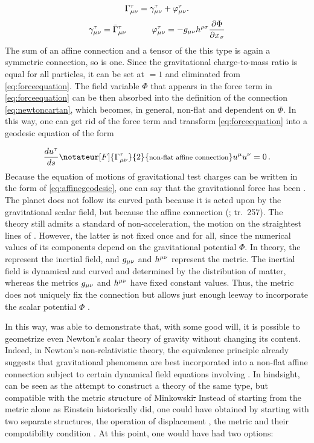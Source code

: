 \documentclass[submitted]{article}
\renewcommand{\Mink}{Minkowski\xspace}
\newcommand{\texts}[1]{\text{\footnotesize{#1}}}
\newcommand{\ctmr}{charge-to-mass ratio\xspace}
\newcommand{\Gtmnbar}{\ensuremath{\bar{\Gamma}\tmn}\xspace}
\renewcommand{\rzlp}[2]{(\cite[#1]{Reichenbach1928}; tr.\ #2)\xspace}
\begin{document}
\begin{equation*}
\Gamma^\tau_{\mu\nu} = \gamma^\tau_{\mu\nu} + \varphi^\tau_{\mu\nu}.
\end{equation*}
%
\begin{align}\label{eq:newtoncartan}
\gamma\tmn= \Gtmnbar & \quad \quad & \varphi\tmn = - g_{\mu \nu} h^{\rho \sigma} \frac{\partial \Phi}{\partial x_\sigma}
\end{align}
%
The sum of an affine connection and a tensor of the this type is again a symmetric connection, so \Gtmn is one. Since the gravitational \ctmr is equal for all particles, it can be set at $=1$ and eliminated from \cref{eq:forceequation}. The field variable $\Phi$ that appears in the force term in \cref{eq:forceequation} can be then absorbed into the definition of the connection \Gtmn \cref{eq:newtoncartan}, which becomes, in general, non-flat and dependent on $\Phi$. In this way, one can get rid of the force term and transform \cref{eq:forceequation} into a geodesic equation of the form

\begin{equation}
\label{eq:affinegeodesic} 
\frac{du^\tau}{\dap} \notateur[F]{\Gtmn}{2}{\texts{non-flat affine connection}} u^\mu u^\nu = 0\,.
\end{equation}
%
Because the equation of motions of gravitational test charges can be written in the form of \cref{eq:affinegeodesic}, one can say that the gravitational force has been . The planet does not follow its curved path because it is acted upon by the gravitational scalar field, but because the affine connection \Gtmn {} \rzlp{295}{257}. The theory still admits a standard of non-acceleration, the motion on the straightest lines of \Gtmn. However, the latter is not fixed once and for all, since the numerical values of its components depend on the gravitational potential $\Phi$. In  theory, the \Gtmn represent the inertial field, and $g_{\mu\nu}$ and $h^{\mu\nu}$ represent the metric. The inertial field \Gtmn is dynamical and curved and determined by the distribution of matter, whereas the metrics $g_{\mu\nu}$ and $h^{\mu\nu}$ have fixed constant values. Thus, the metric does not uniquely fix the connection \Gtmn but allows just enough leeway to incorporate the scalar potential $\Phi$ . 

 In this way, \citet{Friedrichs1928} was able to demonstrate that, with some good will, it is possible to geometrize even Newton's scalar theory of gravity without changing its content. Indeed, in Newton's non-relativistic theory, the equivalence principle already suggests that gravitational phenomena are best incorporated into a non-flat affine connection \Gtmn subject to certain dynamical field equations involving \ritea. In hindsight, \gr can be seen as the attempt to construct a theory of the same type, but compatible with the metric structure of \Mink \st. Instead of starting from the metric alone as Einstein historically did, one could have obtained \gr by starting with two separate structures, the operation of displacement \Gtmn, the metric \gmn and their compatibility condition \nonmetr \citep{Stachel2007}. At this point, one would have had two options:
\end{document}
